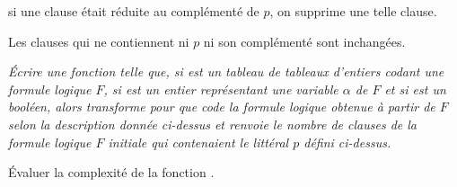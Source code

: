 si une clause était
réduite au complémenté de $p$, on supprime une telle clause. 

Les clauses qui ne contiennent ni $p$ ni son complémenté sont inchangées. 
\begin{Exercise}\it
Écrire une fonction  telle que, si  est un tableau de tableaux d’entiers codant une formule logique $F$, si  est un entier représentant une variable $\alpha$ de $F$ et si  est un booléen, alors  transforme   pour que   code la formule logique obtenue à partir de $F$ selon la description donnée ci-dessus et renvoie le nombre de clauses de la formule logique $F$ initiale qui contenaient le littéral $p$ défini ci-dessus.

Évaluer la complexité de la fonction .
\end{Exercise}
